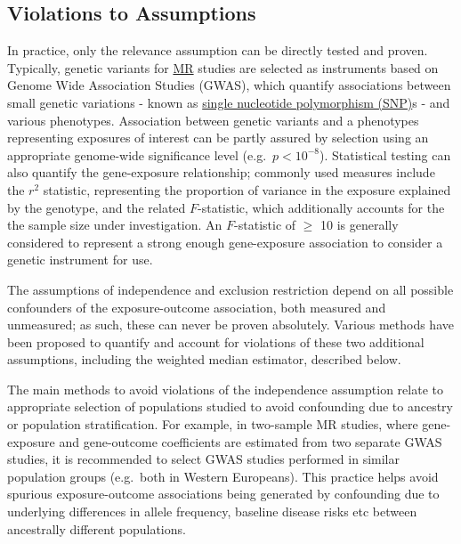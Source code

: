 \documentclass[
]{article}
\begin{document}
\subsection{Violations to Assumptions}\label{violations-to-assumptions}

In practice, only the relevance assumption can be directly tested and proven. Typically, genetic variants for \hyperref[acronyms_MR]{MR} studies are selected as instruments based on Genome Wide Association Studies (GWAS), which quantify associations between small genetic variations - known as \hyperref[acronyms_SNP]{single nucleotide polymorphism (SNP)}s - and various phenotypes. Association between genetic variants and a phenotypes representing exposures of interest can be partly assured by selection using an appropriate genome-wide significance level (e.g.~\(p < 10 ^{-8}\)). Statistical testing can also quantify the gene-exposure relationship; commonly used measures include the \(r^2\) statistic, representing the proportion of variance in the exposure explained by the genotype, and the related \(F\)-statistic, which additionally accounts for the the sample size under investigation\textsuperscript{}. An \(F\)-statistic of \(\ge\) 10 is generally considered to represent a strong enough gene-exposure association to consider a genetic instrument for use\textsuperscript{}.

The assumptions of independence and exclusion restriction depend on all possible confounders of the exposure-outcome association, both measured and unmeasured; as such, these can never be proven absolutely. Various methods have been proposed to quantify and account for violations of these two additional assumptions, including the weighted median estimator, described below\textsuperscript{}.

The main methods to avoid violations of the independence assumption relate to appropriate selection of populations studied to avoid confounding due to ancestry or population stratification. For example, in two-sample MR studies, where gene-exposure and gene-outcome coefficients are estimated from two separate GWAS studies, it is recommended to select GWAS studies performed in similar population groups (e.g.~both in Western Europeans). This practice helps avoid spurious exposure-outcome associations being generated by confounding due to underlying differences in allele frequency, baseline disease risks etc between ancestrally different populations\textsuperscript{}.
\end{document}
